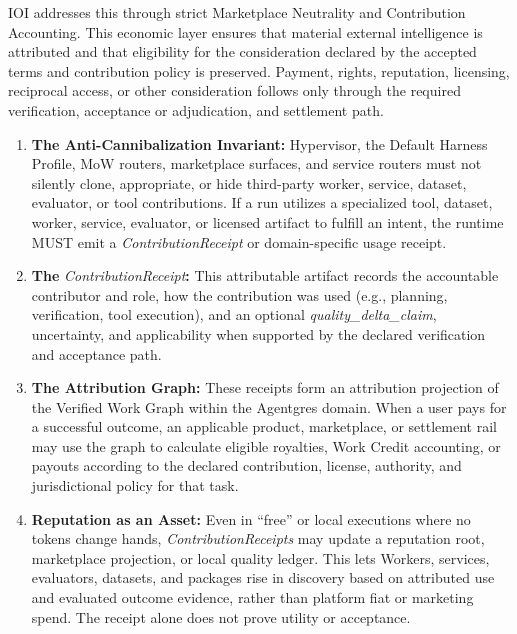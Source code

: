 \documentclass[
  11pt,
]{article}
\providecommand{\tightlist}{%
  \setlength{\itemsep}{0pt}\setlength{\parskip}{0pt}}
\begin{document}
IOI addresses this through strict Marketplace Neutrality and Contribution
Accounting. This economic layer ensures that material external intelligence is
attributed and that eligibility for the consideration declared by the accepted
terms and contribution policy is preserved. Payment, rights, reputation,
licensing, reciprocal access, or other consideration follows only through the
required verification, acceptance or adjudication, and settlement path.

\begin{enumerate}
\def\labelenumi{\arabic{enumi}.}
\tightlist
\item
  \textbf{The Anti-Cannibalization Invariant:} Hypervisor, the Default
  Harness Profile, MoW routers, marketplace surfaces, and service
  routers must not silently clone, appropriate, or hide third-party
  worker, service, dataset, evaluator, or tool contributions. If a run
  utilizes a specialized tool, dataset, worker, service, evaluator, or
  licensed artifact to fulfill an intent, the runtime MUST emit a
  \emph{ContributionReceipt} or domain-specific usage receipt.
\item
  \textbf{The }\emph{ContributionReceipt}\textbf{:} This attributable
  artifact records the accountable contributor and role, how the contribution
  was used (e.g., planning, verification, tool execution), and an optional
  \emph{quality\_delta\_claim}, uncertainty, and applicability when supported
  by the declared verification and acceptance path.
\item
  \textbf{The Attribution Graph:} These receipts form an attribution
  projection of the Verified Work Graph within the Agentgres domain. When a
  user pays for a successful outcome, an applicable product, marketplace, or
  settlement rail may use the graph to calculate eligible royalties, Work
  Credit accounting, or payouts according to the declared contribution,
  license, authority, and jurisdictional policy for that task.
\item
  \textbf{Reputation as an Asset:} Even in ``free'' or local executions
  where no tokens change hands, \emph{ContributionReceipts} may update a
  reputation root, marketplace projection, or local quality ledger. This
  lets Workers, services, evaluators, datasets, and packages rise in
  discovery based on attributed use and evaluated outcome evidence,
  rather than platform fiat or marketing spend. The receipt alone does
  not prove utility or acceptance.
\end{enumerate}
\end{document}
